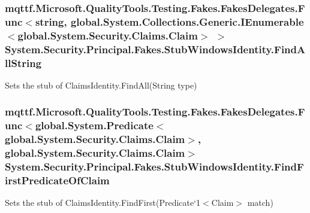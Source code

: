 \hypertarget{class_system_1_1_security_1_1_principal_1_1_fakes_1_1_stub_windows_identity_a9424ce4d8647f64054aa1a1e4945c9c9}{
\subsubsection[{Find\-All\-String}]{\setlength{\rightskip}{0pt plus 5cm}mqttf.\-Microsoft.\-Quality\-Tools.\-Testing.\-Fakes.\-Fakes\-Delegates.\-Func$<$string, global.\-System.\-Collections.\-Generic.\-I\-Enumerable$<$global.\-System.\-Security.\-Claims.\-Claim$>$ $>$ System.\-Security.\-Principal.\-Fakes.\-Stub\-Windows\-Identity.\-Find\-All\-String}}\label{class_system_1_1_security_1_1_principal_1_1_fakes_1_1_stub_windows_identity_a9424ce4d8647f64054aa1a1e4945c9c9}


Sets the stub of Claims\-Identity.\-Find\-All(\-String type)

\hypertarget{class_system_1_1_security_1_1_principal_1_1_fakes_1_1_stub_windows_identity_a219a5eaf952d5b4d05655b74f351238b}{
\subsubsection[{Find\-First\-Predicate\-Of\-Claim}]{\setlength{\rightskip}{0pt plus 5cm}mqttf.\-Microsoft.\-Quality\-Tools.\-Testing.\-Fakes.\-Fakes\-Delegates.\-Func$<$global.\-System.\-Predicate$<$global.\-System.\-Security.\-Claims.\-Claim$>$, global.\-System.\-Security.\-Claims.\-Claim$>$ System.\-Security.\-Principal.\-Fakes.\-Stub\-Windows\-Identity.\-Find\-First\-Predicate\-Of\-Claim}}\label{class_system_1_1_security_1_1_principal_1_1_fakes_1_1_stub_windows_identity_a219a5eaf952d5b4d05655b74f351238b}


Sets the stub of Claims\-Identity.\-Find\-First(Predicate`1$<$Claim$>$ match)


